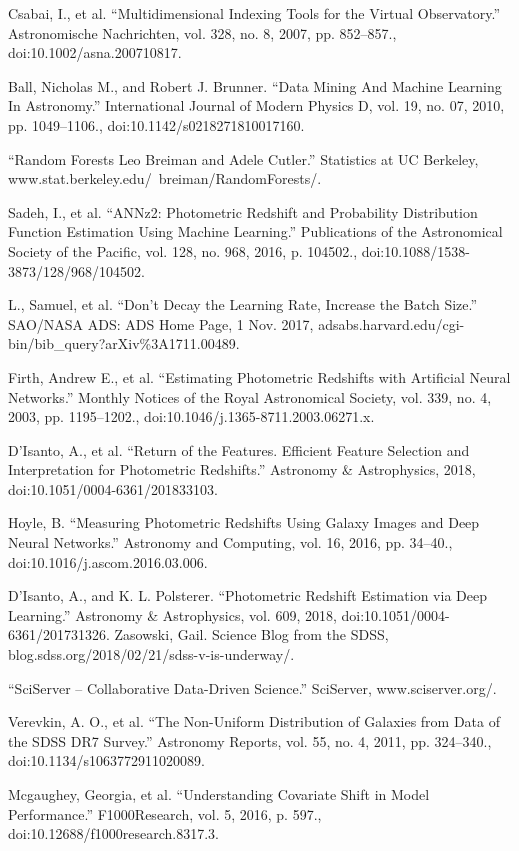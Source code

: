 \documentclass[12pt,letterpaper,twoside,openright]{book}
\begin{document}
\begin{thebibliography}{99\kern\bibindent}
Csabai, I., et al. “Multidimensional Indexing Tools for the Virtual Observatory.” Astronomische Nachrichten, vol. 328, no. 8, 2007, pp. 852–857., doi:10.1002/asna.200710817.


Ball, Nicholas M., and Robert J. Brunner. “Data Mining And Machine Learning In Astronomy.” International Journal of Modern Physics D, vol. 19, no. 07, 2010, pp. 1049–1106., doi:10.1142/s0218271810017160.

“Random Forests Leo Breiman and Adele Cutler.” Statistics at UC Berkeley, www.stat.berkeley.edu/~breiman/RandomForests/.


Sadeh, I., et al. “ANNz2: Photometric Redshift and Probability Distribution Function Estimation Using Machine Learning.” Publications of the Astronomical Society of the Pacific, vol. 128, no. 968, 2016, p. 104502., doi:10.1088/1538-3873/128/968/104502.

L., Samuel, et al. “Don't Decay the Learning Rate, Increase the Batch Size.” SAO/NASA ADS: ADS Home Page, 1 Nov. 2017, adsabs.harvard.edu/cgi-bin/bib\_{}query?arXiv\%{}3A1711.00489.

Firth, Andrew E., et al. “Estimating Photometric Redshifts with Artificial Neural Networks.” Monthly Notices of the Royal Astronomical Society, vol. 339, no. 4, 2003, pp. 1195–1202., doi:10.1046/j.1365-8711.2003.06271.x.

D'Isanto, A., et al. “Return of the Features. Efficient Feature Selection and Interpretation for Photometric Redshifts.” Astronomy \&{} Astrophysics, 2018, doi:10.1051/0004-6361/201833103.

Hoyle, B. “Measuring Photometric Redshifts Using Galaxy Images and Deep Neural Networks.” Astronomy and Computing, vol. 16, 2016, pp. 34–40., doi:10.1016/j.ascom.2016.03.006.

D'Isanto, A., and K. L. Polsterer. “Photometric Redshift Estimation via Deep Learning.” Astronomy \&{} Astrophysics, vol. 609, 2018, doi:10.1051/0004-6361/201731326.
Zasowski, Gail. Science Blog from the SDSS, blog.sdss.org/2018/02/21/sdss-v-is-underway/.

“SciServer – Collaborative Data-Driven Science.” SciServer, www.sciserver.org/.

Verevkin, A. O., et al. “The Non-Uniform Distribution of Galaxies from Data of the SDSS DR7 Survey.” Astronomy Reports, vol. 55, no. 4, 2011, pp. 324–340., doi:10.1134/s1063772911020089.

Mcgaughey, Georgia, et al. “Understanding Covariate Shift in Model Performance.” F1000Research, vol. 5, 2016, p. 597., doi:10.12688/f1000research.8317.3.

\end{thebibliography}
\end{document}
